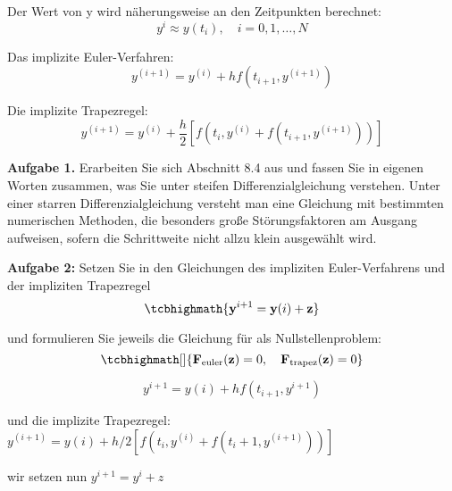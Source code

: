 Der Wert von y wird näherungsweise an den Zeitpunkten berechnet:
\begin{equation}
	 y^i \approx y(t_i),\quad i = 0,1,\dots,N 
\end{equation}


Das implizite Euler-Verfahren:
\begin{equation}
	 y^{(i+1)} = y^{(i)} + hf(t_{i+1},y^{(i+1)}) 
\end{equation}


Die implizite Trapezregel:
\begin{equation}
	y^{(i+1)} = y^{(i)} + \frac{h}{2}\left[f\left(t_i, y^{(i)} + f(t_{i+1},y^{(i+1)})\right)\right] 
\end{equation}



\begin{mybox}
\textbf{Aufgabe 1.}	
	Erarbeiten Sie sich Abschnitt 8.4 aus \cite{Atkinson.2004} und fassen Sie in eigenen Worten zusammen, was Sie unter steifen Differenzialgleichung verstehen.
	Unter einer starren Differenzialgleichung versteht man eine Gleichung mit bestimmten numerischen Methoden, die besonders große Störungsfaktoren am Ausgang aufweisen, sofern die Schrittweite nicht allzu klein ausgewählt wird.
\end{mybox}



\begin{mybox}
	\textbf{Aufgabe 2:}
	Setzen Sie in den Gleichungen des impliziten Euler-Verfahrens und der impliziten Trapezregel
	\begin{equation*}
	\tcbhighmath{\mathbf{y}^{i+1} = \mathbf{y}(i) + \mathbf{z}}  
	\end{equation*}
	
	und formulieren Sie jeweils die Gleichung für  als Nullstellenproblem:
	\begin{equation*}
		\tcbhighmath[]{\mathbf{F}_{\mathrm{euler}}(\mathbf{z}) = 0,\quad \mathbf{F}_{\mathrm{trapez}}(\mathbf{z}) = 0}   
	\end{equation*}
	
\end{mybox}


\begin{equation}
 	y^{i+1} = y(i) + hf(t_{i+1},y^{i+1}) 
\end{equation}


und die implizite Trapezregel:
$ y^(i+1) = y(i) + h/2[f(t_i, y^(i) + f(t_i+1,y^(i+1)))] $

wir setzen nun
$ y^{i+1} = y^i + z $

